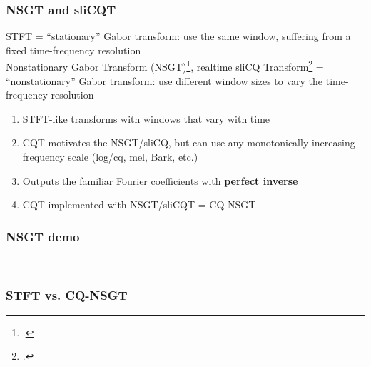 \documentclass[usenames,dvipsnames]{beamer}
\begin{document}
\begin{frame}
	\frametitle{NSGT and sliCQT}
	STFT = ``stationary'' Gabor transform: use the same window, suffering from a fixed time-frequency resolution\\
	Nonstationary Gabor Transform (NSGT)\footcite{balazs}, realtime sliCQ Transform\footcite{invertiblecqt, slicq, variableq1} = ``nonstationary'' Gabor transform: use different window sizes to vary the time-frequency resolution\\
	\begin{enumerate}
	\item
		STFT-like transforms with windows that vary with time
	\item
		CQT motivates the NSGT/sliCQ, but can use any monotonically increasing frequency scale (log/cq, mel, Bark, etc.)
	\item
		Outputs the familiar Fourier coefficients with \textbf{perfect inverse}
	\item
		CQT implemented with NSGT/sliCQT = CQ-NSGT
	\end{enumerate}
\end{frame}

\begin{frame}
	\frametitle{NSGT demo}
	\begin{figure}[ht]
		\vspace{-0.5em}
		\setcounter{subfigure}{0}
		\\
		\vspace{-0.5em}
	\end{figure}
\end{frame}

\begin{frame}
	\frametitle{STFT vs. CQ-NSGT}
	\begin{figure}[ht]
		\setcounter{subfigure}{0}
		\centering
		\vspace{-1em}
		\vspace{-0.5em}
	\end{figure}
\end{frame}
\end{document}
